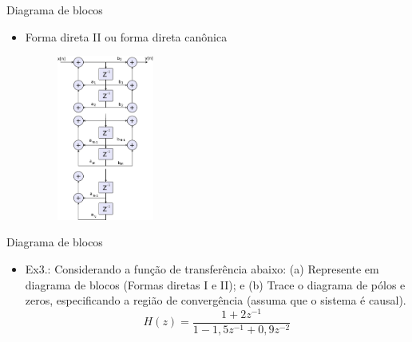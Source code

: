 \begin{slide}{Diagrama de blocos}
\begin{itemize}
     \item Forma direta II ou forma direta canônica
   \begin{figure}
       \centering
        \includegraphics[width = 0.30\textwidth]{figs/fd2.eps}
   \end{figure}
\end{itemize}
\end{slide}

\begin{slide}{Diagrama de blocos}
\begin{itemize}
   \item Ex3.: Considerando a função de transferência abaixo: (a) Represente em diagrama de blocos (Formas diretas I e II); e (b) Trace o diagrama de pólos e zeros, especificando a região de convergência (assuma que o sistema é causal).
    \begin{equation*}
        H(z)=\frac{1+2z^{-1}}{1-1,5z^{-1}+0,9z^{-2}}
    \end{equation*}
\end{itemize}
\end{slide}

